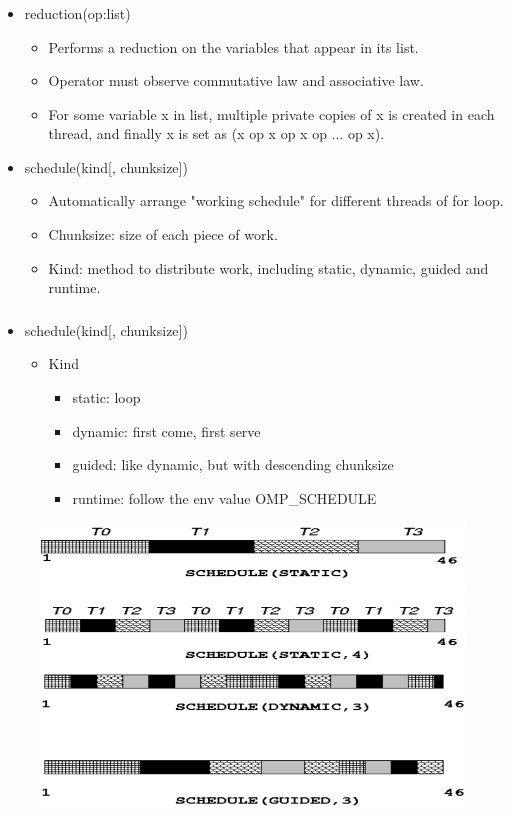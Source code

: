 \documentclass{beamer}
\begin{document}
	\begin{frame}
		\frametitle{\insertsubsection}
		\begin{itemize}
			\item reduction(op:list) \begin{itemize}
				\item Performs a reduction on the variables that appear in its list.
				\item Operator must observe commutative law and associative law.
				\item For some variable x in list, multiple private copies of x is created in each thread, and finally x is set as (x op x op x op ... op x).
			\end{itemize}
			\item schedule(kind[, chunksize]) \begin{itemize}
				\item Automatically arrange "working schedule" for different threads of for loop.
				\item Chunksize: size of each piece of work.
				\item Kind: method to distribute work, including static, dynamic, guided and runtime.
			\end{itemize}
		\end{itemize}
	\end{frame}
	\begin{frame}
		\frametitle{\insertsubsection}
		\begin{itemize}
			\item schedule(kind[, chunksize])
			\begin{itemize}
				\item Kind
				\begin{itemize}
					\item static: loop
					\item dynamic: first come, first serve
					\item guided: like dynamic, but with descending chunksize
					\item runtime: follow the env value OMP\_SCHEDULE
				\end{itemize}
			\end{itemize}
		\end{itemize}
		\begin{figure}[H]
			\centering
			\includegraphics[width=0.8\linewidth]{schedule.png}
		\end{figure}
	\end{frame}
\end{document}
